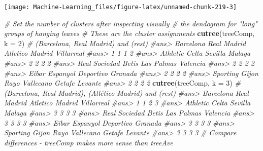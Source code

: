 \documentclass[]{book}
\newenvironment{Shaded}{\begin{snugshade}}{\end{snugshade}}
\newcommand{\KeywordTok}[1]{\textcolor[rgb]{0.13,0.29,0.53}{\textbf{#1}}}
\newcommand{\DataTypeTok}[1]{\textcolor[rgb]{0.13,0.29,0.53}{#1}}
\newcommand{\DecValTok}[1]{\textcolor[rgb]{0.00,0.00,0.81}{#1}}
\newcommand{\CommentTok}[1]{\textcolor[rgb]{0.56,0.35,0.01}{\textit{#1}}}
\newcommand{\NormalTok}[1]{#1}
\theoremstyle{definition}
\theoremstyle{definition}
\theoremstyle{definition}
\theoremstyle{remark}
\begin{document}
\begin{center}\texttt{[image: Machine-Learning\_files/figure-latex/unnamed-chunk-219-3]} \end{center}

\begin{Shaded}
\begin{Highlighting}[]

\CommentTok{# Set the number of clusters after inspecting visually}
\CommentTok{# the dendogram for "long" groups of hanging leaves}
\CommentTok{# These are the cluster assignments}
\KeywordTok{cutree}\NormalTok{(treeComp, }\DataTypeTok{k =} \DecValTok{2}\NormalTok{) }\CommentTok{# (Barcelona, Real Madrid) and (rest)}
\CommentTok{#ans>       Barcelona     Real Madrid Atletico Madrid      Villarreal }
\CommentTok{#ans>               1               1               1               2 }
\CommentTok{#ans>        Athletic           Celta         Sevilla          Malaga }
\CommentTok{#ans>               2               2               2               2 }
\CommentTok{#ans>   Real Sociedad           Betis      Las Palmas        Valencia }
\CommentTok{#ans>               2               2               2               2 }
\CommentTok{#ans>           Eibar        Espanyol       Deportivo         Granada }
\CommentTok{#ans>               2               2               2               2 }
\CommentTok{#ans>  Sporting Gijon  Rayo Vallecano          Getafe         Levante }
\CommentTok{#ans>               2               2               2               2}
\KeywordTok{cutree}\NormalTok{(treeComp, }\DataTypeTok{k =} \DecValTok{3}\NormalTok{) }\CommentTok{# (Barcelona, Real Madrid), (Atlético Madrid) and (rest)}
\CommentTok{#ans>       Barcelona     Real Madrid Atletico Madrid      Villarreal }
\CommentTok{#ans>               1               1               2               3 }
\CommentTok{#ans>        Athletic           Celta         Sevilla          Malaga }
\CommentTok{#ans>               3               3               3               3 }
\CommentTok{#ans>   Real Sociedad           Betis      Las Palmas        Valencia }
\CommentTok{#ans>               3               3               3               3 }
\CommentTok{#ans>           Eibar        Espanyol       Deportivo         Granada }
\CommentTok{#ans>               3               3               3               3 }
\CommentTok{#ans>  Sporting Gijon  Rayo Vallecano          Getafe         Levante }
\CommentTok{#ans>               3               3               3               3}
\CommentTok{# Compare differences - treeComp makes more sense than treeAve}

\end{Highlighting}
\end{Shaded}
\end{document}

